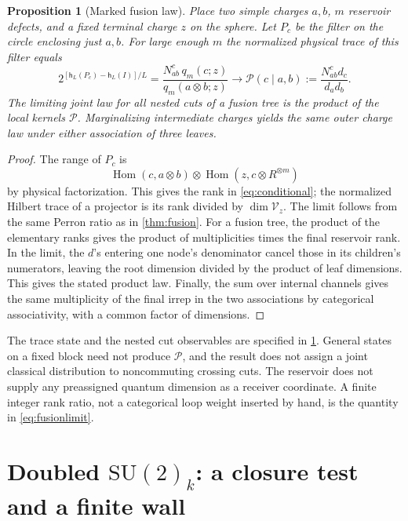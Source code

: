 \documentclass[11pt]{article}
\numberwithin{equation}{section}
\newtheorem{proposition}[theorem]{Proposition}
\theoremstyle{definition}
\theoremstyle{remark}
\DeclareMathOperator{\Hom}{Hom}
\newcommand{\State}{\mathcal V}
\newcommand{\su}{\mathrm{SU}(2)_k}
\begin{document}
\begin{proposition}[Marked fusion law]\label{prop:law}
Place two simple charges \(a,b\), \(m\) reservoir defects, and a fixed terminal charge \(z\) on the sphere. Let \(P_c\) be the filter on the circle enclosing just \(a,b\). For large enough \(m\) the normalized physical trace of this filter equals
\begin{equation}\label{eq:conditional}
 2^{[\mathsf h_L(P_c)-\mathsf h_L(I)]/L}
   =\frac{N_{ab}^{c}\,q_m(c;z)}{q_m(a\otimes b;z)}
   \longrightarrow \mathcal P(c\mid a,b)
   :=\frac{N_{ab}^{c}d_c}{d_a d_b}.
\end{equation}
The limiting joint law for all nested cuts of a fusion tree is the product of the local kernels \(\mathcal P\). Marginalizing intermediate charges yields the same outer charge law under either association of three leaves.
\end{proposition}

\begin{proof}
The range of \(P_c\) is
\[
 \Hom(c,a\otimes b)\otimes\Hom(z,c\otimes R^{\otimes m})
\]
by physical factorization. This gives the rank in \eqref{eq:conditional}; the normalized Hilbert trace of a projector is its rank divided by \(\dim\State_z\). The limit follows from the same Perron ratio as in \cref{thm:fusion}. For a fusion tree, the product of the elementary ranks gives the product of multiplicities times the final reservoir rank. In the limit, the \(d\)'s entering one node's denominator cancel those in its children's numerators, leaving the root dimension divided by the product of leaf dimensions. This gives the stated product law. Finally, the sum over internal channels gives the same multiplicity of the final irrep in the two associations by categorical associativity, with a common factor of dimensions.
\end{proof}

The trace state and the nested cut observables are specified in \cref{prop:law}. General states on a fixed block need not produce \(\mathcal P\), and the result does not assign a joint classical distribution to noncommuting crossing cuts. The reservoir does not supply any preassigned quantum dimension as a receiver coordinate. A finite integer rank ratio, not a categorical loop weight inserted by hand, is the quantity in \eqref{eq:fusionlimit}.

\section{Doubled \texorpdfstring{\(\su\)}{SU(2)k}: a closure test and a finite wall}\label{sec:closure}
\end{document}
